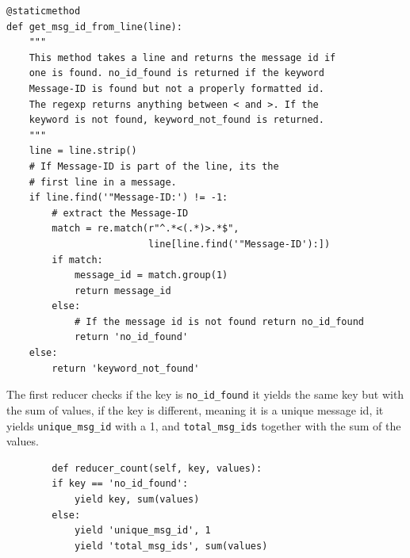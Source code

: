 \documentclass[runningheads,a4paper]{llncs}
\begin{document}
\begin{verbatim}
@staticmethod
def get_msg_id_from_line(line):
    """
    This method takes a line and returns the message id if
    one is found. no_id_found is returned if the keyword
    Message-ID is found but not a properly formatted id.
    The regexp returns anything between < and >. If the
    keyword is not found, keyword_not_found is returned.
    """
    line = line.strip()
    # If Message-ID is part of the line, its the
    # first line in a message.
    if line.find('"Message-ID:') != -1:
        # extract the Message-ID
        match = re.match(r"^.*<(.*)>.*$",
                         line[line.find('"Message-ID'):])
        if match:
            message_id = match.group(1)
            return message_id
        else:
            # If the message id is not found return no_id_found
            return 'no_id_found'
    else:
        return 'keyword_not_found'
\end{verbatim}
The first reducer checks if the key is \verb!no_id_found! it yields the same key but with the sum of values, if the key is different, meaning it is a unique message id, it yields \verb!unique_msg_id! with a 1, and \verb!total_msg_ids! together with the sum of the values.

\begin{verbatim}
        def reducer_count(self, key, values):
        if key == 'no_id_found':
            yield key, sum(values)
        else:
            yield 'unique_msg_id', 1
            yield 'total_msg_ids', sum(values)
\end{verbatim}
\end{document}
